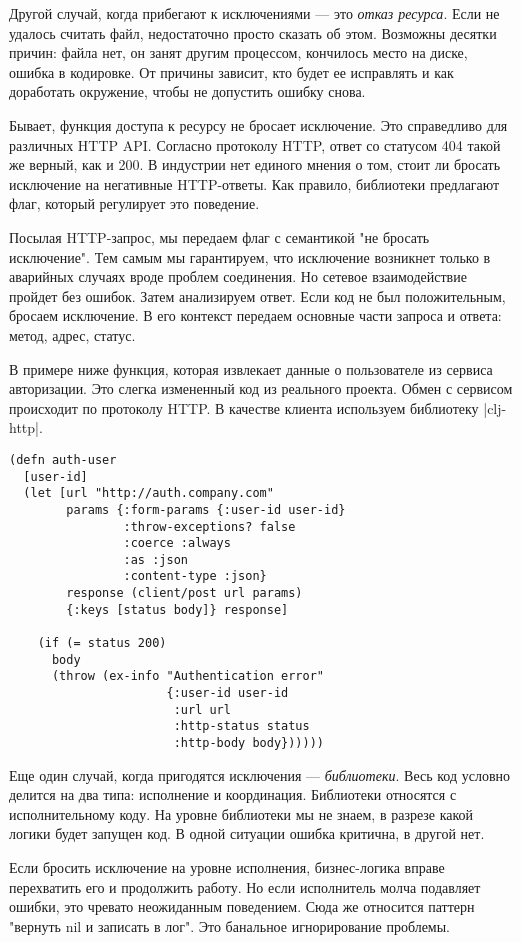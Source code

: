 Другой случай, когда прибегают к исключениями — это \emph{отказ ресурса}. Если не
удалось считать файл, недостаточно просто сказать об этом. Возможны десятки
причин: файла нет, он занят другим процессом, кончилось место на диске, ошибка в
кодировке. От причины зависит, кто будет ее исправлять и как доработать
окружение, чтобы не допустить ошибку снова.

Бывает, функция доступа к ресурсу не бросает исключение. Это справедливо для
различных HTTP API. Согласно протоколу HTTP, ответ со статусом 404 такой же
верный, как и 200. В индустрии нет единого мнения о том, стоит ли бросать
исключение на негативные HTTP-ответы. Как правило, библиотеки предлагают флаг,
который регулирует это поведение.

Посылая HTTP-запрос, мы передаем флаг с семантикой "не бросать исключение". Тем
самым мы гарантируем, что исключение возникнет только в аварийных случаях вроде
проблем соединения. Но сетевое взаимодействие пройдет без ошибок. Затем
анализируем ответ. Если код не был положительным, бросаем исключение. В его
контекст передаем основные части запроса и ответа: метод, адрес, статус.

В примере ниже функция, которая извлекает данные о пользователе из сервиса
авторизации. Это слегка измененный код из реального проекта. Обмен с сервисом
происходит по протоколу HTTP. В качестве клиента используем библиотеку
\spverb|clj-http|.

\begin{verbatim}
(defn auth-user
  [user-id]
  (let [url "http://auth.company.com"
        params {:form-params {:user-id user-id}
                :throw-exceptions? false
                :coerce :always
                :as :json
                :content-type :json}
        response (client/post url params)
        {:keys [status body]} response]

    (if (= status 200)
      body
      (throw (ex-info "Authentication error"
                      {:user-id user-id
                       :url url
                       :http-status status
                       :http-body body})))))
\end{verbatim}

Еще один случай, когда пригодятся исключения — \emph{библиотеки}. Весь код условно
делится на два типа: исполнение и координация. Библиотеки относятся с
исполнительному коду. На уровне библиотеки мы не знаем, в разрезе какой логики
будет запущен код. В одной ситуации ошибка критична, в другой нет.

Если бросить исключение на уровне исполнения, бизнес-логика вправе перехватить
его и продолжить работу. Но если исполнитель молча подавляет ошибки, это чревато
неожиданным поведением. Сюда же относится паттерн "вернуть nil и записать в
лог". Это банальное игнорирование проблемы.

